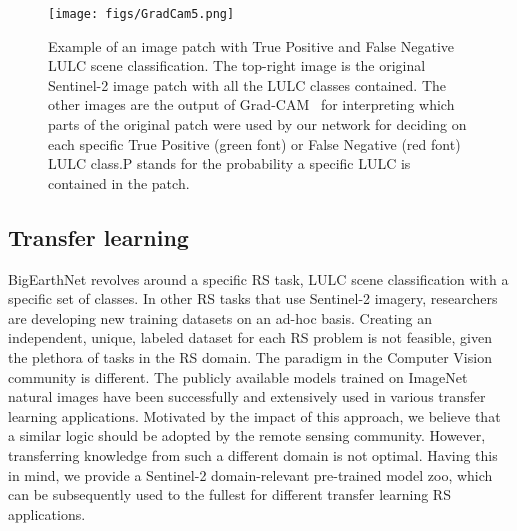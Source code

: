\documentclass[journal]{IEEEtran}
\begin{document}
 


\begin{figure*}[!ht]
\centering
 \texttt{[image: figs/GradCam5.png]}
\caption{Example of an image patch with True Positive and False Negative LULC scene classification. The top-right image is the original Sentinel-2 image patch with all the LULC classes contained. The other images are the output of Grad-CAM~\citep{Selvaraju_2017_ICCV} for interpreting which parts of the original patch were used by our network for deciding on each specific True Positive (green font) or False Negative (red font) LULC class.P stands for the probability a specific LULC is contained in the patch.}
\label{fig:GradCamFN}
\end{figure*}



\subsection{Transfer learning}

BigEarthNet revolves around a specific RS task, LULC scene classification with a specific set of classes. In other RS tasks that use Sentinel-2 imagery, researchers are developing new training datasets on an ad-hoc basis. Creating an independent, unique, labeled dataset for each RS problem is not feasible, given the plethora of tasks in the RS domain. The paradigm in the Computer Vision community is different. The publicly available models trained on ImageNet natural images have been successfully and extensively used in various transfer learning applications. Motivated by the impact of this approach, we believe that a similar logic should be adopted by the remote sensing community. However, transferring knowledge from such a different domain is not optimal. Having this in mind, we provide a Sentinel-2 domain-relevant pre-trained model zoo, which can be subsequently used to the fullest for different transfer learning RS applications.
\end{document}
